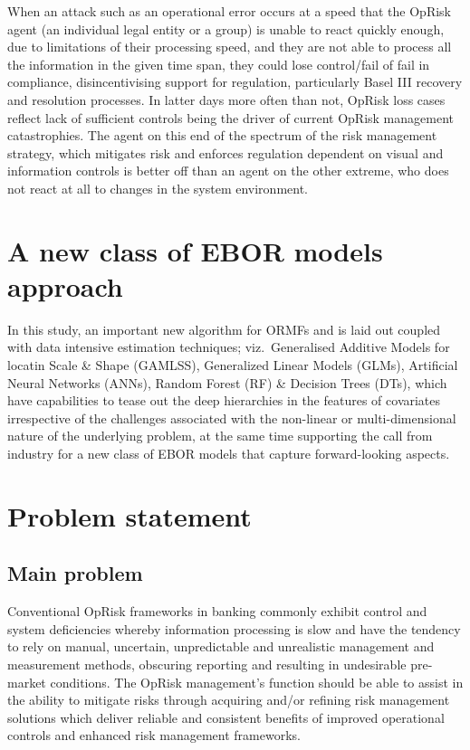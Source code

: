 \documentclass{DissertateUSU}
\begin{document}
When an attack such as an operational error occurs at a speed that the
OpRisk agent (an individual legal entity or a group) is unable to react
quickly enough, due to limitations of their processing speed, and they
are not able to process all the information in the given time span, they
could lose control/fail of fail in compliance, disincentivising support
for regulation, particularly Basel III recovery and resolution
processes. In latter days more often than not, OpRisk loss cases reflect
lack of sufficient controls being the driver of current OpRisk
management catastrophies. The agent on this end of the spectrum of the
risk management strategy, which mitigates risk and enforces regulation
dependent on visual and information controls is better off than an agent
on the other extreme, who does not react at all to changes in the system
environment.

\section{A new class of EBOR models approach}
\label{sec:A new class of EBOR models approach}

In this study, an important new algorithm for ORMFs and is laid out
coupled with data intensive estimation techniques; viz.~Generalised
Additive Models for locatin Scale \& Shape (GAMLSS), Generalized Linear
Models (GLMs), Artificial Neural Networks (ANNs), Random Forest (RF) \&
Decision Trees (DTs), which have capabilities to tease out the deep
hierarchies in the features of covariates irrespective of the challenges
associated with the non-linear or multi-dimensional nature of the
underlying problem, at the same time supporting the call from industry
for a new class of EBOR models that capture forward-looking aspects.

\section{Problem statement}
\label{sec:Problem statement}

\subsection{Main problem}
\label{ssec:Main problem}

Conventional OpRisk frameworks in banking commonly exhibit control and
system deficiencies whereby information processing is slow and have the
tendency to rely on manual, uncertain, unpredictable and unrealistic
management and measurement methods, obscuring reporting and resulting in
undesirable pre-market conditions. The OpRisk management's function
should be able to assist in the ability to mitigate risks through
acquiring and/or refining risk management solutions which deliver
reliable and consistent benefits of improved operational controls and
enhanced risk management frameworks.\medskip
\end{document}
